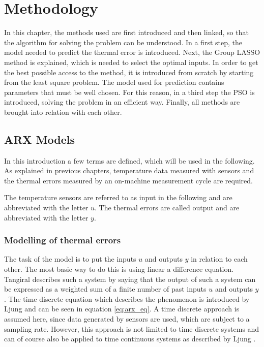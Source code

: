 \chapter{Methodology}
\label{chp:sample_chapter}



In this chapter, the methods used are first introduced and then linked, so that the algorithm for solving the problem can be understood. In a first step, the model needed to predict the thermal error is introduced. Next, the Group LASSO method is explained, which is needed to select the optimal inputs.  In order to get the best possible access to the method, it is introduced from scratch by starting from the least square problem.  
The model used for prediction contains parameters that must be well chosen. For this reason, in a third step the PSO is introduced, solving the problem in an efficient way. Finally, all methods are brought into relation with each other.



\section{ARX Models}
\label{sec:ARX_models}


In this introduction a few terms are defined, which will be used in the following. As explained in previous chapters, temperature data measured with sensors and the thermal errors measured by an on-machine measurement cycle are required.

The temperature sensors are referred to as input in the following and are abbreviated with the letter $u$. The thermal errors are called output and are abbreviated with the letter $y$. 

\subsection{Modelling of thermal errors}
\label{sec:modelling of errors}

The task of the model is to put the inputs $u$ and outputs $y$ in relation to each other. The most basic way to do this is using linear a difference equation. Tangiral \cite{Tangiral_2014} describes such a system by saying that the output of such a system can be expressed as a weighted sum of a finite number of past inputs $u$ and outputs $y$. The time discrete equation which describes the phenomenon is introduced by Ljung \cite{Ljung_1999} and can be seen in equation \ref{eq:arx_eq}. A time discrete approach is assumed here, since data generated by sensors are used, which are subject to a sampling rate. However, this approach is not limited to time discrete systems and can of course also be applied to time continuous systems as described by Ljung \cite{Ljung_1999}.

